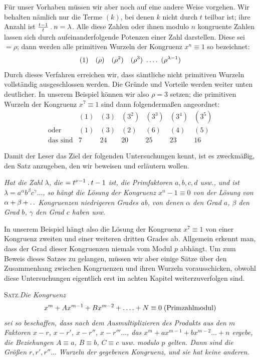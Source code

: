 Für unser Vorhaben müssen wir aber noch auf eine andere Weise vorgehen. Wir behalten nämlich nur die Terme $(k)$, bei denen $k$ nicht durch $t$ teilbar ist; ihre Anzahl ist $\frac{t-1}{t}\mathbin{.} n=\lambda$. Alle diese Zahlen oder ihnen modulo $n$ kongruente Zahlen lassen sich durch aufeinanderfolgende Potenzen einer Zahl darstellen. Diese sei $=\rho$; dann werden alle primitiven Wurzeln der Kongruenz $x^n\equiv1$ so bezeichnet:
\[
(1)\quad(\rho)\quad(\rho^2)\quad(\rho^3)\ \dotsfour\ (\rho^{\lambda-1})
\]
Durch dieses Verfahren erreichen wir, dass sämtliche nicht primitiven Wurzeln vollständig ausgeschlossen werden. Die Gründe und Vorteile werden weiter unten deutlicher. In unserem Beispiel können wir also $\rho=3$ setzen; die primitiven Wurzeln der Kongruenz $x^7\equiv1$ sind dann folgendermaßen angeordnet:
\[
\begin{array}{rcccccc}
&(1)&(3)&(3^2)&(3^3)&(3^4)&(3^5)\\
\text{oder}&(1)&(3)&(2)&(6)&(4)&(5)\\
\text{das sind}&7&24&20&25&23&16
\end{array}
\]

Damit der Leser das Ziel der folgenden Untersuchungen kennt, ist es zweckmäßig, den Satz anzugeben, den wir beweisen und erläutern wollen.

\emph{Hat die Zahl $\lambda$, die $=t^{\nu-1}\mathbin{.} t-1$ ist, die Primfaktoren $a,b,c,d$ usw., und ist $\lambda=a^\alpha b^\beta c^\gamma\ldots$, so hängt die Lösung der Kongruenz $x^n-1\equiv0$ von der Lösung von $\alpha+\beta+\mathinner{.\,.}$ Kongruenzen niedrigeren Grades ab, von denen $\alpha$ den Grad $a$, $\beta$ den Grad $b$, $\gamma$ den Grad $c$ haben usw.}

In unserem Beispiel hängt also die Lösung der Kongruenz $x^7\equiv1$ von einer Kongruenz zweiten und einer weiteren dritten Grades ab. Allgemein erkennt man, dass der Grad dieser Kongruenzen niemals vom Modul $p$ abhängt. Um zum Beweis dieses Satzes zu gelangen, müssen wir aber einige Sätze über den Zusammenhang zwischen Kongruenzen und ihren Wurzeln vorausschicken, obwohl diese Untersuchungen eigentlich erst im achten Kapitel weiterzuverfolgen sind.

\textsc{Satz.}\quad\emph{Die Kongruenz}
\[
x^m+Ax^{m-1}+Bx^{m-2}+\mathinner{.\,.\,.\,.}+N\equiv0\;(\text{Primzahlmodul})
\]
\emph{sei so beschaffen, dass nach dem Ausmultiplizieren des Produkts aus den $m$ Faktoren $x-r$, $x-r'$, $x-r''$, $x-r'''\ldots$, das $x^m+ax^{m-1}+bx^{m-2}\ldots+n$ ergebe, die Beziehungen $A\equiv a$, $B\equiv b$, $C\equiv c$ usw. modulo $p$ gelten. Dann sind die Größen $r,r',r''\ldots$ Wurzeln der gegebenen Kongruenz, und sie hat keine anderen.}

